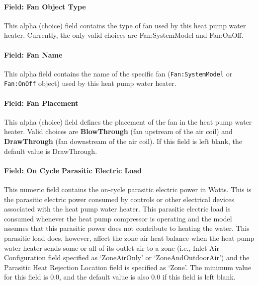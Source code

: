 \paragraph{Field: Fan Object Type}\label{field-fan-object-type-001}

This alpha (choice) field contains the type of fan used by this heat pump water heater. Currently, the only valid choices are Fan:SystemModel and Fan:OnOff.

\paragraph{Field: Fan Name}\label{field-fan-name-004}

This alpha field contains the name of the specific fan (\lstinline!Fan:SystemModel! or \lstinline!Fan:OnOff! object) used by this heat pump water heater.

\paragraph{Field: Fan Placement}\label{field-fan-placement-000}

This alpha (choice) field defines the placement of the fan in the heat pump water heater. Valid choices are \textbf{BlowThrough} (fan upstream of the air coil) and \textbf{DrawThrough} (fan downstream of the air coil). If this field is left blank, the default value is DrawThrough.

\paragraph{Field: On Cycle Parasitic Electric Load}\label{field-on-cycle-parasitic-electric-load-000}

This numeric field contains the on-cycle parasitic electric power in Watts. This is the parasitic electric power consumed by controls or other electrical devices associated with the heat pump water heater. This parasitic electric load is consumed whenever the heat pump compressor is operating and the model assumes that this parasitic power does not contribute to heating the water. This parasitic load does, however, affect the zone air heat balance when the heat pump water heater sends some or all of its outlet air to a zone (i.e., Inlet Air Configuration field specified as `ZoneAirOnly' or `ZoneAndOutdoorAir') and the Parasitic Heat Rejection Location field is specified as `Zone'. The minimum value for this field is 0.0, and the default value is also 0.0 if this field is left blank.

